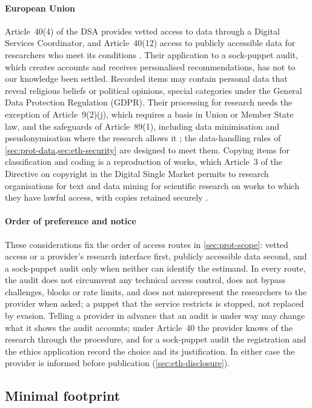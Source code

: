\paragraph{European Union}
Article~40(4) of the DSA provides vetted access to data through a Digital Services Coordinator, and Article~40(12) access to publicly accessible data for researchers who meet its conditions \citep{eu2022dsa,eu2025delegated}. Their application to a sock-puppet audit, which creates accounts and receives personalised recommendations, has not to our knowledge been settled. Recorded items may contain personal data that reveal religious beliefs or political opinions, special categories under the General Data Protection Regulation (GDPR). Their processing for research needs the exception of Article~9(2)(j), which requires a basis in Union or Member State law, and the safeguards of Article~89(1), including data minimisation and pseudonymisation where the research allows it \citep{eu2016gdpr}; the data-handling rules of \cref{sec:prot-data,sec:eth-security} are designed to meet them. Copying items for classification and coding is a reproduction of works, which Article~3 of the Directive on copyright in the Digital Single Market permits to research organisations for text and data mining for scientific research on works to which they have lawful access, with copies retained securely \citep{eu2019dsm}.

\paragraph{Order of preference and notice}
These considerations fix the order of access routes in \cref{sec:prot-scope}: vetted access or a provider's research interface first, publicly accessible data second, and a sock-puppet audit only when neither can identify the estimand. In every route, the audit does not circumvent any technical access control, does not bypass challenges, blocks or rate limits, and does not misrepresent the researchers to the provider when asked; a puppet that the service restricts is stopped, not replaced by evasion. Telling a provider in advance that an audit is under way may change what it shows the audit accounts; under Article~40 the provider knows of the research through the procedure, and for a sock-puppet audit the registration and the ethics application record the choice and its justification. In either case the provider is informed before publication (\cref{sec:eth-disclosure}).

\subsection{Minimal footprint}\label{sec:eth-footprint}

